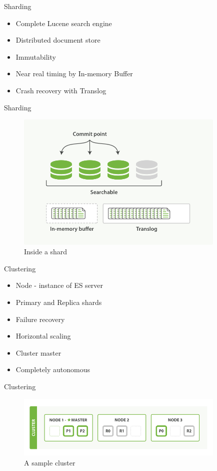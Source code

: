 \documentclass[10pt]{beamer}
\begin{document}
\begin{frame}{Sharding}
	\begin{itemize}
		\item Complete Lucene search engine
		\item Distributed document store
		\item Immutability
		\item Near real timing by In-memory Buffer
		\item Crash recovery with Translog
	\end{itemize}
\end{frame}

\begin{frame}{Sharding}
	\begin{figure}
		\centering\includegraphics[width=10cm]{inside_shard}
		\caption{Inside a shard}
	\end{figure}
\end{frame}

\begin{frame}{Clustering}
	\begin{itemize}
		\item Node - instance of ES server
		\item Primary and Replica shards
		\item Failure recovery
		\item Horizontal scaling
		\item Cluster master
		\item Completely autonomous
	\end{itemize}
\end{frame}

\begin{frame}{Clustering}
	\begin{figure}
		\centering\includegraphics[width=10cm]{cluster}
		\caption{A sample cluster}
	\end{figure}
\end{frame}
\end{document}

